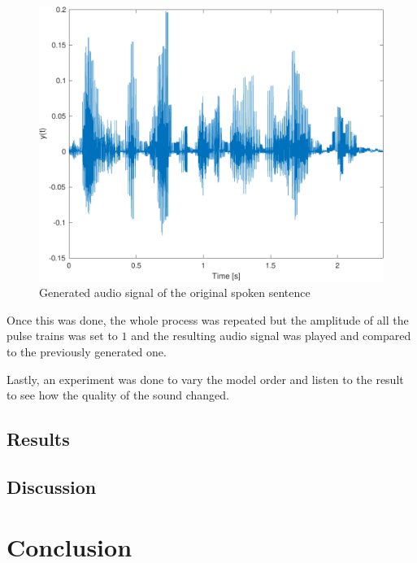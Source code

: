 \documentclass{IEEEtran}
\begin{document}
\begin{figure}[h]
  \centering
  \captionsetup{justification=centering}

  \includegraphics[width=0.8\columnwidth]{pictures/vim_gen.pdf}
  \caption{Generated audio signal of the original spoken sentence}
  \label{3:genvim}

\end{figure}

Once this was done, the whole process was repeated but the amplitude
of all the pulse trains was set to $1$ and the resulting audio signal
was played and compared to the previously generated one.

Lastly, an experiment was done to vary the model order and listen to
the result to see how the quality of the sound changed.

\subsection{Results}


\subsection{Discussion}

\section{Conclusion}
\end{document}
